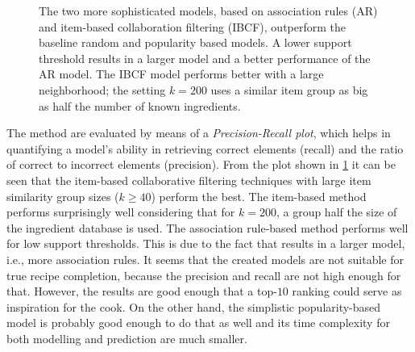 \begin{figure}[htbp]
	\centering

	
	
	\caption{The two more sophisticated models, based on association rules (AR) and item-based collaboration filtering (IBCF),  outperform the baseline random and popularity based models. A lower support threshold results in a larger model and a better performance of the AR model. The IBCF model performs better with a large neighborhood; the setting $k=200$ uses a similar item group as big as half the number of known ingredients.}
	\label{fig:ingredients_recommendations_pr}
\end{figure}

The method are evaluated by means of a \emph{Precision-Recall plot}, which helps in quantifying a model's ability in retrieving correct elements (recall) and the ratio of correct to incorrect elements (precision).
From the plot shown in \cref{fig:ingredients_recommendations_pr} it can be seen that the item-based collaborative filtering techniques with large item similarity group sizes ($k \geq 40$) perform the best.
The item-based method performs surprisingly well considering that for $k=200$, a group half the size of the ingredient database is used.
The association rule-based method performs well for low support thresholds.
This is due to the fact that results in a larger model, i.e., more association rules.
It seems that the created models are not suitable for true recipe completion, because the precision and recall are not high enough for that.
However, the results are good enough that a top-$10$ ranking could serve as inspiration for the cook.
On the other hand, the simplistic popularity-based model is probably good enough to do that as well and its time complexity for both modelling and prediction are much smaller.